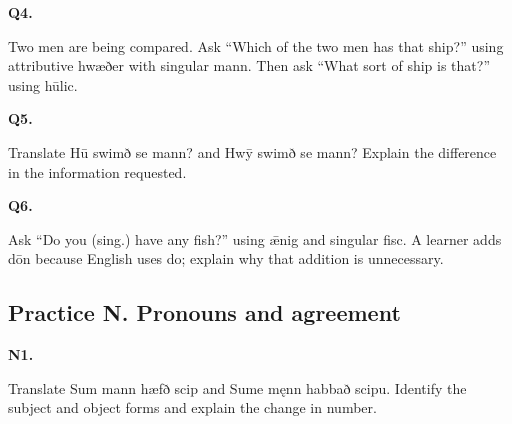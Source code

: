 \par\begin{minipage}{\linewidth}\raggedright
\textbf{Q4.}

Two men are being compared. Ask “Which of the two men has that ship?” using attributive hwæðer with singular mann. Then ask “What sort of ship is that?” using hūlic.

\end{minipage}\par\addvspace{4pt}

\par\begin{minipage}{\linewidth}\raggedright
\textbf{Q5.}

Translate Hū swimð se mann? and Hwȳ swimð se mann? Explain the difference in the information requested.

\end{minipage}\par\addvspace{4pt}

\par\begin{minipage}{\linewidth}\raggedright
\textbf{Q6.}

Ask “Do you (sing.) have any fish?” using ǣnig and singular fisc. A learner adds dōn because English uses do; explain why that addition is unnecessary.

\end{minipage}\par\addvspace{4pt}

\subsection*{Practice N. Pronouns and agreement}

\par\begin{minipage}{\linewidth}\raggedright
\textbf{N1.}

Translate Sum mann hæfð scip and Sume męnn habbað scipu. Identify the subject and object forms and explain the change in number.

\end{minipage}\par\addvspace{4pt}

